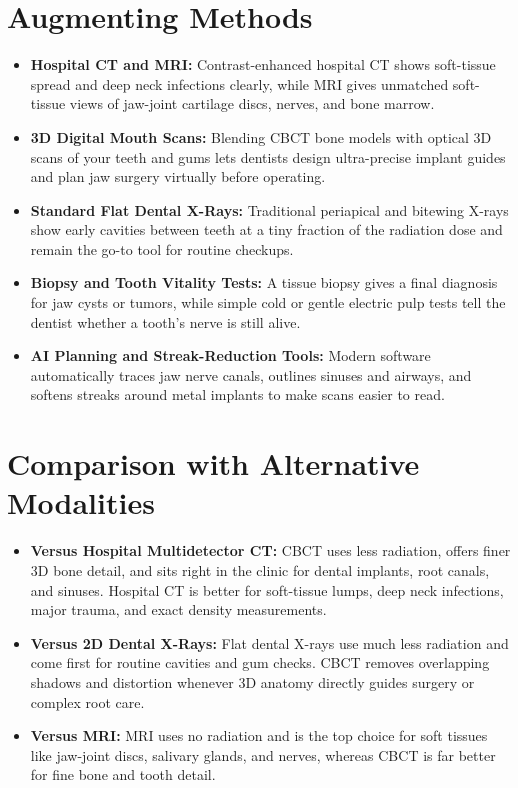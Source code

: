 \section{Augmenting Methods}
\begin{itemize}
    \item \textbf{Hospital CT and MRI:} Contrast-enhanced hospital CT shows soft-tissue spread and deep neck infections clearly, while MRI gives unmatched soft-tissue views of jaw-joint cartilage discs, nerves, and bone marrow.
    \item \textbf{3D Digital Mouth Scans:} Blending CBCT bone models with optical 3D scans of your teeth and gums lets dentists design ultra-precise implant guides and plan jaw surgery virtually before operating.
    \item \textbf{Standard Flat Dental X-Rays:} Traditional periapical and bitewing X-rays show early cavities between teeth at a tiny fraction of the radiation dose and remain the go-to tool for routine checkups.
    \item \textbf{Biopsy and Tooth Vitality Tests:} A tissue biopsy gives a final diagnosis for jaw cysts or tumors, while simple cold or gentle electric pulp tests tell the dentist whether a tooth's nerve is still alive.
    \item \textbf{AI Planning and Streak-Reduction Tools:} Modern software automatically traces jaw nerve canals, outlines sinuses and airways, and softens streaks around metal implants to make scans easier to read.
\end{itemize}

\section{Comparison with Alternative Modalities}
\begin{itemize}
    \item \textbf{Versus Hospital Multidetector CT:} CBCT uses less radiation, offers finer 3D bone detail, and sits right in the clinic for dental implants, root canals, and sinuses. Hospital CT is better for soft-tissue lumps, deep neck infections, major trauma, and exact density measurements.
    \item \textbf{Versus 2D Dental X-Rays:} Flat dental X-rays use much less radiation and come first for routine cavities and gum checks. CBCT removes overlapping shadows and distortion whenever 3D anatomy directly guides surgery or complex root care.
    \item \textbf{Versus MRI:} MRI uses no radiation and is the top choice for soft tissues like jaw-joint discs, salivary glands, and nerves, whereas CBCT is far better for fine bone and tooth detail.
\end{itemize}

